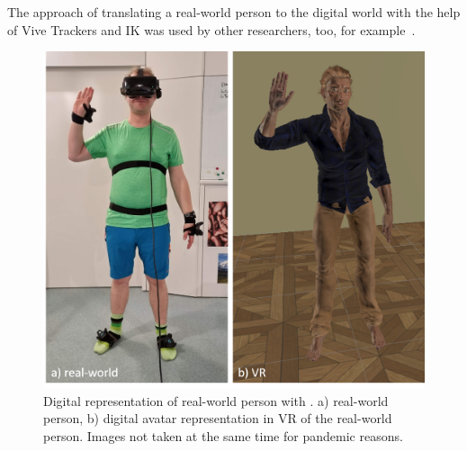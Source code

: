 The approach of translating a real-world person to the digital world with the help of Vive Trackers and IK was used by other researchers, too, for example~\cite{samesetup,perspectivematters}. 

\begin{figure}[H]
	\centering
	\includegraphics[width=\textwidth]{figures/selfPerception.png}	
	\caption[Digital representation of real-world person.]{Digital representation of real-world person with \exgo. a) real-world person, b) digital avatar representation in VR of the real-world person. Images not taken at the same time for pandemic reasons.}
	\label{fig:selfPerception}
\end{figure}

